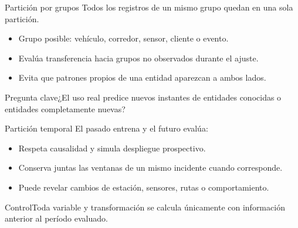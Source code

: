 \documentclass[aspectratio=169,10pt]{beamer}
\newcommand{\br}{\\}
\newcommand{\pregunta}[1]{\begin{block}{Pregunta clave}#1\end{block}}
\begin{document}
\begin{frame}{Partición por grupos}
  \small Todos los registros de un mismo grupo quedan en una sola partición.
  \begin{center}\end{center}
  \begin{itemize}
    \item Grupo posible: vehículo, corredor, sensor, cliente o evento.
    \item Evalúa transferencia hacia grupos no observados durante el ajuste.
    \item Evita que patrones propios de una entidad aparezcan a ambos lados.
  \end{itemize}
  \pregunta{¿El uso real predice nuevos instantes de entidades conocidas o entidades completamente nuevas?}
\end{frame}

\begin{frame}{Partición temporal}
  \small El pasado entrena y el futuro evalúa:
  \begin{center}\end{center}
  \begin{itemize}
    \item Respeta causalidad y simula despliegue prospectivo.
    \item Conserva juntas las ventanas de un mismo incidente cuando corresponde.
    \item Puede revelar cambios de estación, sensores, rutas o comportamiento.
  \end{itemize}
  \begin{alertblock}{Control}Toda variable y transformación se calcula únicamente con información anterior al período evaluado.\end{alertblock}
\end{frame}
\end{document}
